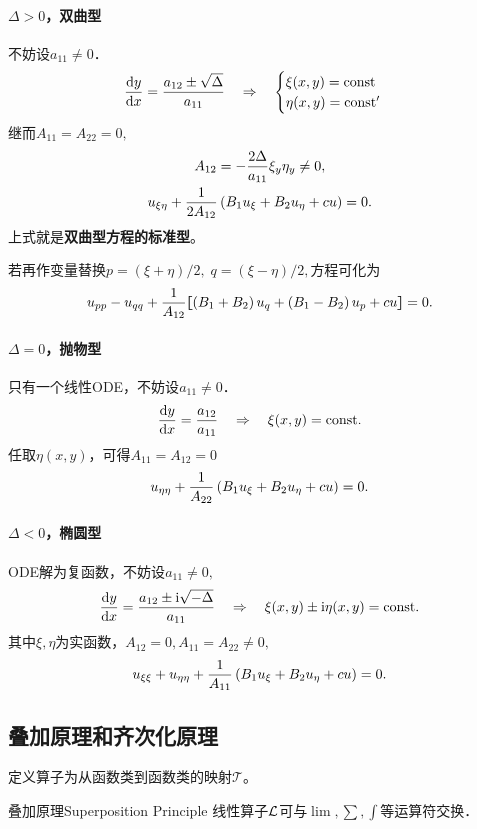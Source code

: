 \paragraph*{$\Delta>0$，双曲型}不妨设$a_{11}\neq 0$．
\begin{align}
	\frac{\mathrm{d}^{\;\!\!}y}{\mathrm{d} x^{\;\!\!}}=\frac{a_{12}\pm\sqrt\Delta}{a_{11}}\quad\Rightarrow\quad
	\begin{cases}
		\xi(x,y)=\mathrm{const} \\
		\eta(x,y)=\mathrm{const}'
	\end{cases}
\end{align}
继而$A_{11}=A_{22}=0,$
\begin{gather}\notag
	A_{12}=-\frac{2\Delta}{a_{11}}\xi_y\eta_y\neq 0,\\
	u_{\xi\eta}+\frac1{2A_{12}}\left(B_1u_\xi+B_2u_\eta+cu\right)=0.
\end{gather}
上式就是\textbf{双曲型方程的标准型}。

若再作变量替换$p=(\xi+\eta)/2,\;q=(\xi-\eta)/2,$方程可化为
\begin{align}
	u_{pp}-u_{qq}+\frac1{A_{12}}\lfloor\hspace{-4.7 pt}\lceil \left(B_1+B_2\right)u_q+\left(B_1-B_2\right)u_p+cu\rceil\hspace{-4.7 pt}\rfloor=0.
\end{align}
\paragraph*{$\Delta=0$，抛物型}只有一个线性ODE，不妨设$a_{11}\neq 0$．
\begin{align}
	\frac{\mathrm{d}^{\;\!\!}y}{\mathrm{d} x^{\;\!\!}}=\frac{a_{12}}{a_{11}}\quad\Rightarrow\quad\xi(x,y)=\mathrm{const}.
\end{align}
任取$\eta(x,y)$，可得$A_{11}=A_{12}=0$
\begin{align}
	u_{\eta\eta}+\frac1{A_{22}}\left(B_1u_\xi+B_2u_\eta+cu\right)=0.
\end{align}
\paragraph*{$\Delta<0$，椭圆型}ODE解为复函数，不妨设$a_{11}\neq 0,$
\begin{align}
	\frac{\mathrm{d}^{\;\!\!}y}{\mathrm{d} x^{\;\!\!}}=\frac{a_{12}\pm\mathrm{i}\sqrt{-\Delta}}{a_{11}}\quad\Rightarrow\quad \xi(x,y)\pm\mathrm{i}\eta(x,y)=\mathrm{const}.
\end{align}
其中$\xi,\eta$为实函数，$A_{12}=0,A_{11}=A_{22}\neq 0,$
\begin{align}
	u_{\xi\xi}+u_{\eta\eta}+\frac1{A_{11}}\left(B_1u_\xi+B_2u_\eta+cu\right)=0.
\end{align}
\subsection{叠加原理和齐次化原理}
定义算子为从函数类到函数类的映射$\mathcal T$。
\begin{theorem}{叠加原理}{Superposition Principle}
	线性算子$\mathcal L$可与$\textstyle\lim,\sum,\int$等运算符交换．%
\end{theorem}


